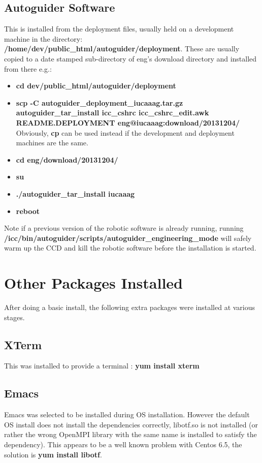 \documentclass[10pt,a4paper]{article}
\begin{document}
\subsection{Autoguider Software}

This is installed from the deployment files, usually held on a development machine in the directory:
{\bf /home/dev/public\_html/autoguider/deployment}. These are usually copied to a date stamped sub-directory of eng's download directory and installed from there e.g.:

\begin{itemize}
\item {\bf cd \mytilde dev/public\_html/autoguider/deployment}
\item {\bf scp -C autoguider\_deployment\_iucaaag.tar.gz autoguider\_tar\_install icc\_cshrc icc\_cshrc\_edit.awk README.DEPLOYMENT eng@iucaaag:download/20131204/} Obviously, {\bf cp} can be used instead if the development and deployment machines are the same.
\item {\bf cd \mytilde eng/download/20131204/}
\item {\bf su}
\item {\bf ./autoguider\_tar\_install iucaaag}
\item {\bf reboot}
\end{itemize}

Note if a previous version of the robotic software is already running, running 
{\bf /icc/bin/autoguider/scripts/autoguider\_engineering\_mode} 
will safely warm up the CCD and kill the robotic software before the installation is started.

\section{Other Packages Installed}

After doing a basic install, the following extra packages were installed at various stages.

\subsection{XTerm}

This was installed to provide a terminal : {\bf yum install xterm}

\subsection{Emacs}

Emacs was selected to be installed during OS installation. However the default OS install does not install the dependencies correctly, libotf.so is not installed (or rather the wrong OpenMPI library with the same name is installed to satisfy the dependency). This appears to be a well known problem with Centos 6.5, the solution is {\bf yum install libotf}.
\end{document}
